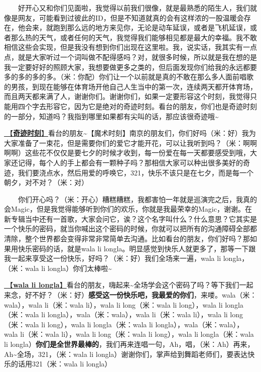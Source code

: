 \documentclass[]{ctexbook}
\begin{document}
  好开心又和你们见面啦，我觉得以前我们很像，就是最熟悉的陌生人，我们就像是网友，可能看到过彼此的ID，但是不知道就真的会有这样浓的一股温暖会存在，他会来，就跑到那么远的地方来见你，无论是动车延误，或者是飞机延误，或者那么热的天气，或者任何的天气，我觉得我们能够相见都是最大的幸福。我不敢相信这些会实现，但是我没有想到你们出现在这里啦。我，说实话，我其实有一点点，就是大家听过一个词叫做不配得感吗？对，就很多时候，所以就是我在想的是我一定要好好的照顾大家，我想要做更多之类的，但后面发现你们给我的永远都要多的多的多的多。（米：你配）你们让一个以前就是真的不敢在那么多人面前唱歌的男孩，到现在能够在体育场开他自己人生当中的第一次，连续两天都开体育场，而且两天都来满了人，谢谢你们。谢谢你们，如果一定要形容这个时刻，我觉得只能用四个字去形容它，因为它是绝对的奇迹时刻。看台的朋友，你们也是奇迹时刻的一部分，知道吗？我指到哪里如果都有尖叫的话，那应该很奇迹哦\textasciitilde{}

\hyperref[magic-moment]{🎵【\textbf{奇迹时刻}】}看台的朋友\textasciitilde【魔术时刻】南京的朋友们，你们好吗（米：好）我为大家准备了一束花，但是需要你们的爱它才能开花，可以让我听到吗？（米：啊啊啊啊）这些花不仅仅是要七夕的时候才收到，每一份爱在每一天都要感受到哦，大家还记得，每个人的手上都会有一颗种子吗？那相信大家可以种出很多美好的奇迹，我们要浇点水，然后用爱的呼唤它，321，快乐不该只是在七夕，而是每一个朝夕，对不对？（米：对）

  你们开心吗？（米：开心）糟糕糟糕，我都害怕一年就是巡演完之后，我真的会Magic，但是我觉得能够听到你们的欢乐，你就是我最荣幸的Magic，谢谢。在新专辑当中还有一首歌，大家会问它，诶？这个名字叫什么？什么意思？它其实是一个快乐的密码，就当你喊出这个密码的时候，你就可以把所有的沟通障碍全部都清除，整个世界都会变得非常非常简单去沟通。比如看台的朋友，你们好吗？那如果用快乐密码的话，就是wala li longla。明显感觉到快乐人就更多了，那等一下跟我一起来享受这一份快乐，好吗？（米：好）我们全场来一遍，wala li longla，（米：wala li longla）你们太棒啦\textasciitilde{}

\hyperref[wala-li-longla]{🎵【\textbf{wala li longla}】}看台的朋友，嗨起来\textasciitilde 全场学会这个密码了吗？等下我们一起来念，好不好？（米：好）\textbf{感受这一份快乐吧，我最爱的你们}，来喽。wala（米：wala），wala li（米：wala li），wala li long（米：wala li long），wala li longla（米：wala li longla），wala（米：wala），wala li（米：wala li），wala li long（米：wala li long），wala li longla（米：wala li longla），wala（米：wala），wala li（米：wala li），wala li long（米：wala li long），wala li longla（米：wala li longla）\textbf{你们是全世界最棒的}，我们再来连唱一句，Ah，唱，（米：Ah）再来，Ah\textasciitilde 全场，321，（米：wala li longla）谢谢你们，掌声给到舞蹈老师们，要表达快乐的话用321（米：wala li longla）
\end{document}
